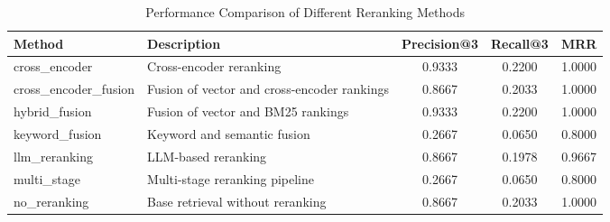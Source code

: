 \begin{table}[htbp]
\caption{Performance Comparison of Different Reranking Methods}
\begin{center}
\begin{tabular}{|l|p{5cm}|c|c|c|}
\hline
\textbf{Method} & \textbf{Description} & \textbf{Precision@3} & \textbf{Recall@3} & \textbf{MRR} \\ 
\hline
cross_encoder & Cross-encoder reranking & 0.9333 & 0.2200 & 1.0000 \\ 
cross_encoder_fusion & Fusion of vector and cross-encoder rankings & 0.8667 & 0.2033 & 1.0000 \\ 
hybrid_fusion & Fusion of vector and BM25 rankings & 0.9333 & 0.2200 & 1.0000 \\ 
keyword_fusion & Keyword and semantic fusion & 0.2667 & 0.0650 & 0.8000 \\ 
llm_reranking & LLM-based reranking & 0.8667 & 0.1978 & 0.9667 \\ 
multi_stage & Multi-stage reranking pipeline & 0.2667 & 0.0650 & 0.8000 \\ 
no_reranking & Base retrieval without reranking & 0.8667 & 0.2033 & 1.0000 \\ 
\hline
\end{tabular}
\label{tab:reranking}
\end{center}
\end{table}
